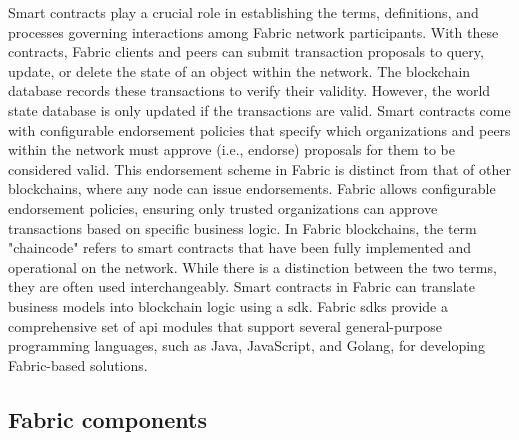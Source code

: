 \documentclass[conference]{IEEEtran}
\begin{document}
Smart contracts play a crucial role in establishing the terms, definitions, and processes governing interactions among Fabric network participants. With these contracts, Fabric clients and peers can submit transaction proposals to query, update, or delete the state of an object within the network. The blockchain database records these transactions to verify their validity. However, the world state database is only updated if the transactions are valid. Smart contracts come with configurable endorsement policies that specify which organizations and peers within the network must approve (i.e., endorse) proposals for them to be considered valid. This endorsement scheme in Fabric is distinct from that of other blockchains, where any node can issue endorsements. Fabric allows configurable endorsement policies, ensuring only trusted organizations can approve transactions based on specific business logic. In Fabric blockchains, the term "chaincode" refers to smart contracts that have been fully implemented and operational on the network. While there is a distinction between the two terms, they are often used interchangeably. Smart contracts in Fabric can translate business models into blockchain logic using a \ac{sdk}. Fabric \ac{sdk}s provide a comprehensive set of \ac{api} modules that support several general-purpose programming languages, such as Java, JavaScript, and Golang, for developing Fabric-based solutions.  

\subsection{Fabric components}
\end{document}
